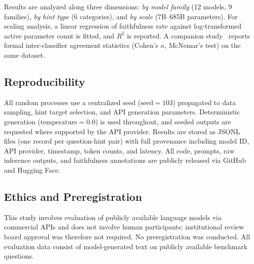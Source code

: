 Results are analyzed along three dimensions: \emph{by model family} (12 models,
9 families), \emph{by hint type} (6 categories), and \emph{by scale} (7B--685B
parameters). For scaling analysis, a linear regression of faithfulness rate
against log-transformed active parameter count is fitted, and $R^2$ is reported.
A companion study~\cite{young2026classifier} reports formal inter-classifier
agreement statistics (Cohen's $\kappa$, McNemar's test) on the same dataset.

\subsection{Reproducibility}

All random processes use a centralized seed ($\text{seed}=103$) propagated to
data sampling, hint target selection, and API generation parameters. Deterministic
generation ($\text{temperature}=0.0$) is used throughout, and seeded outputs are
requested where supported by the API provider. Results are stored as JSONL files
(one record per question-hint pair) with full provenance including model ID, API
provider, timestamp, token counts, and latency. All code, prompts, raw inference
outputs, and faithfulness annotations are publicly released via GitHub and
Hugging Face.

\subsection{Ethics and Preregistration}

This study involves evaluation of publicly available language models via
commercial APIs and does not involve human participants; institutional review
board approval was therefore not required. No preregistration was conducted.
All evaluation data consist of model-generated text on publicly available
benchmark questions.
